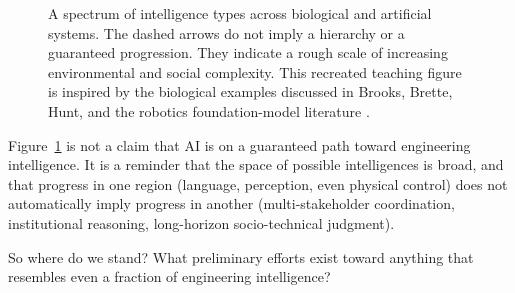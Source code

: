 \documentclass[12pt]{article}
\begin{document}
\begin{figure}[ht]
    \centering
    \caption{A spectrum of intelligence types across biological and artificial systems. The dashed arrows do not imply a hierarchy or a guaranteed progression. They indicate a rough scale of increasing environmental and social complexity. This recreated teaching figure is inspired by the biological examples discussed in Brooks, Brette, Hunt, and the robotics foundation-model literature \cite{brooks1991representation,brette2021paramecium,hunt1996crows,brohan2023rt2,kim2025openvla}.}
    \label{t18fig:intelligence_spectrum}
\end{figure}

Figure~\ref{t18fig:intelligence_spectrum} is not a claim that AI is on a guaranteed path toward engineering intelligence. It is a reminder that the space of possible intelligences is broad, and that progress in one region (language, perception, even physical control) does not automatically imply progress in another (multi-stakeholder coordination, institutional reasoning, long-horizon socio-technical judgment).

So where do we stand? What preliminary efforts exist toward anything that resembles even a fraction of engineering intelligence?
\end{document}
